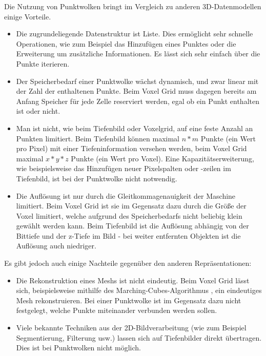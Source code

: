 Die Nutzung von Punktwolken bringt im Vergleich zu anderen 3D-Datenmodellen einige Vorteile.

\begin{itemize}
\item Die zugrundeliegende Datenstruktur ist Liste.
Dies ermöglicht sehr schnelle Operationen, wie zum Beispiel das Hinzufügen eines Punktes oder die Erweiterung um zusätzliche Informationen.
Es lässt sich sehr einfach über die Punkte iterieren.
\item Der Speicherbedarf einer Punktwolke wächst dynamisch, und zwar linear mit der Zahl der enthaltenen Punkte.
Beim Voxel Grid muss dagegen bereits am Anfang Speicher für jede Zelle reserviert werden, egal ob ein Punkt enthalten ist oder nicht.
\item Man ist nicht, wie beim Tiefenbild oder Voxelgrid, auf eine feste Anzahl an Punkten limitiert.
Beim Tiefenbild können maximal $n * m$ Punkte (ein Wert pro Pixel) mit einer Tiefeninformation versehen werden, beim Voxel Grid maximal $x * y * z$ Punkte (ein Wert pro Voxel).
Eine Kapazitätserweiterung, wie beispielsweise das Hinzufügen neuer Pixelspalten oder -zeilen im Tiefenbild, ist bei der Punktwolke nicht notwendig.
\item Die Auflösung ist nur durch die Gleitkommagenauigkeit der Maschine limitiert.
Beim Voxel Grid ist sie im Gegensatz dazu durch die Größe der Voxel limitiert, welche aufgrund des Speicherbedarfs nicht beliebig klein gewählt werden kann.
Beim Tiefenbild ist die Auflösung abhängig von der Bittiefe und der z-Tiefe im Bild - bei weiter entfernten Objekten ist die Auflösung auch niedriger.
\end{itemize}

Es gibt jedoch auch einige Nachteile gegenüber den anderen Repräsentationen:

\begin{itemize}
\item Die Rekonstruktion eines Meshs ist nicht eindeutig.
Beim Voxel Grid lässt sich, beispielsweise mithilfe des Marching-Cubes-Algorithmus \cite{lorensen1987marching}, ein eindeutiges Mesh rekonstruieren.
Bei einer Punktwolke ist im Gegensatz dazu nicht festgelegt, welche Punkte miteinander verbunden werden sollen.
\item Viele bekannte Techniken aus der 2D-Bildverarbeitung (wie zum Beispiel Segmentierung, Filterung usw.) lassen sich auf Tiefenbilder direkt übertragen.
Dies ist bei Punktwolken nicht möglich.
\end{itemize}


